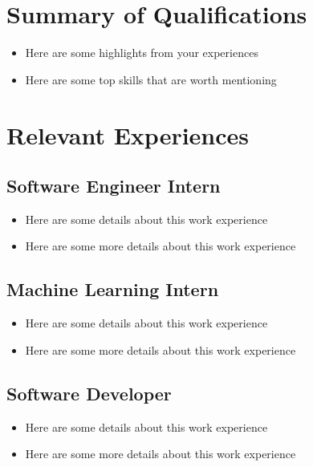 \documentclass{mxresume}
\begin{document}
\begin{minipage}[t]{0.73\textwidth} %
\begin{resumebody}
\begin{large}
\section*{Summary of Qualifications}
\begin{itemize}[leftmargin=4.5mm] %
\setlength{\itemsep}{0mm}
\item Here are some highlights from your experiences
\item Here are some top skills that are worth mentioning
\end{itemize}
\section*{Relevant Experiences} 
\subsection*{Software Engineer Intern}
\begin{itemize}[leftmargin=4.5mm] %
\setlength{\itemsep}{0mm}
\item Here are some details about this work experience
\item Here are some more details about this work experience
\end{itemize}
\subsection*{Machine Learning Intern}
\begin{itemize}[leftmargin=4.5mm] %
\setlength{\itemsep}{0mm}
\item Here are some details about this work experience
\item Here are some more details about this work experience
\end{itemize}
\subsection*{Software Developer}
\begin{itemize}[leftmargin=4.5mm]
\setlength{\itemsep}{0mm}
\item Here are some details about this work experience
\item Here are some more details about this work experience
\end{itemize}

\end{large}
\end{resumebody}
\end{minipage}
\end{document}
